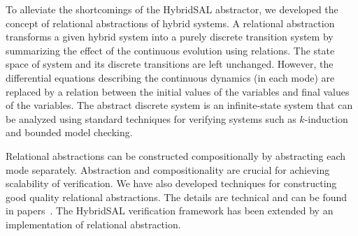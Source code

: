 \documentclass{article}
\begin{document}
To alleviate the shortcomings of the HybridSAL abstractor,
we developed the concept of relational abstractions of hybrid
systems.  A relational abstraction transforms a given hybrid system into
a purely discrete transition system by summarizing the effect
of the continuous evolution using relations.   The state space
of system and its discrete transitions are left unchanged. 
However, the differential equations describing the
continuous dynamics (in each mode) are replaced by a 
relation between the initial values of the variables and 
final values of the variables.
The abstract discrete system is an infinite-state system that can be
analyzed using standard techniques for verifying systems such
as $k$-induction and bounded model checking.

Relational abstractions can be constructed compositionally by 
abstracting each mode separately.  Abstraction and compositionality
are crucial for achieving scalability of verification.
We have also developed techniques for constructing good quality 
relational abstractions.  The details are technical and can be 
found in papers~\cite{ST11:CAV,Tiwari03:HSCC}.  The HybridSAL verification framework has 
been extended by an implementation of relational abstraction.



%
%
%
%
%
\end{document}
